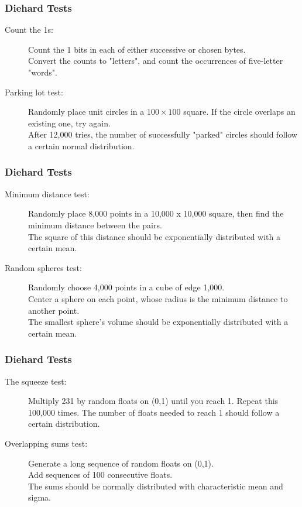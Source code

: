 \documentclass[MAIN.tex]{subfiles}
\begin{document}
\begin{frame}[fragile]
\frametitle{Diehard Tests}
\large
\begin{description}
\item[Count the 1s:] Count the 1 bits in each of either successive or chosen bytes. \\ Convert the counts to "letters", and count the occurrences of five-letter "words".
\item[Parking lot test:] Randomly place unit circles in a $100 \times 100$ square. If the circle overlaps an existing one, try again. \\ After 12,000 tries, the number of successfully "parked" circles should follow a certain normal distribution.
\end{description}
\end{frame}
\begin{frame}[fragile]
\frametitle{Diehard Tests}
\large
\begin{description}
\item[Minimum distance test:] Randomly place 8,000 points in a 10,000 x 10,000 square, then find the minimum distance between the pairs.\\ The square of this distance should be exponentially distributed with a certain mean. \bigskip
\item[Random spheres test:] Randomly choose 4,000 points in a cube of edge 1,000. \\ Center a sphere on each point, whose radius is the minimum distance to another point. \\The smallest sphere's volume should be exponentially distributed with a certain mean.
\end{description}
\end{frame}
\begin{frame}[fragile]
\frametitle{Diehard Tests}
\begin{description}
\item[The squeeze test:] Multiply 231 by random floats on (0,1) until you reach 1. Repeat this 100,000 times. The number of floats needed to reach 1 should follow a certain distribution. \bigskip
\item[Overlapping sums test:] Generate a long sequence of random floats on (0,1). \\ Add sequences of 100 consecutive floats.\\ The sums should be normally distributed with characteristic mean and sigma.
\end{description}
\end{frame}
\end{document}
